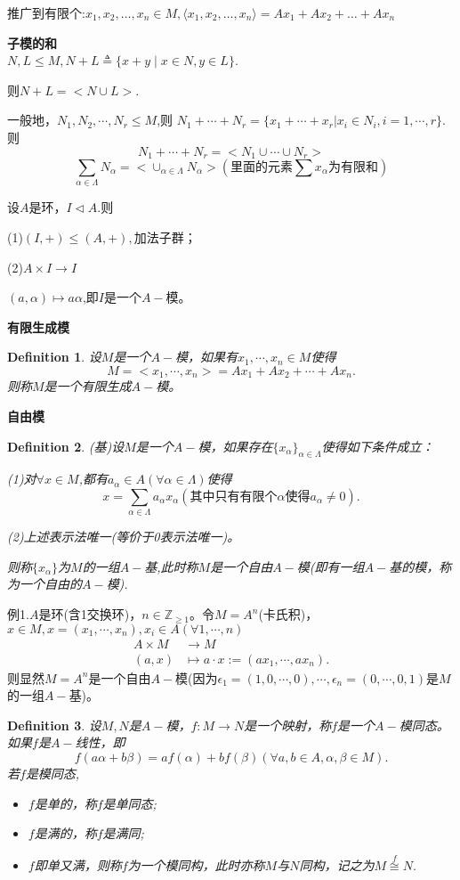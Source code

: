 \documentclass[UTF8]{article}
\newtheorem{defn}{Definition}[section]
\begin{document}
推广到有限个:$x_1,x_2,\dots,x_n\in M,\langle {x_1,x_2,\dots,x_n}\rangle=Ax_1+Ax_2+\dots+Ax_n$

\textbf{子模的和}\\
$N,L\leq M,N+L\triangleq\{x+y\mid x\in N,y\in L\}$.


则$N+L=<N\cup L>$.

一般地，$N_{1},N_{2},\cdots,N_{r}\leq M$,则
$N_{1}+\cdots+N_{r}=\{x_{1}+\cdots+x_{r}|x_{i}\in N_{i},i=1,\cdots,r\}.$则
$$
N_{1}+\cdots+N_{r}=<N_{1}\cup \cdots\cup N_{r}>
$$
$$
\sum_{\alpha\in \Lambda}N_{\alpha}=<\cup_{\alpha\in \Lambda}N_{\alpha}>(\text{里面的元素}\sum x_{\alpha}\text{为有限和})
$$

设$A$是环，$I\vartriangleleft A$.则

(1)$(I,+)\leq (A,+),$加法子群；

(2)$A\times I\rightarrow I$

$(a,\alpha)\mapsto a\alpha$,即$I$是一个$A-$模。

\textbf{有限生成模}

\begin{defn}
	设$M$是一个$A-$模，如果有$x_{1},\cdots,x_{n}\in M$使得
	$$
	M=<x_{1},\cdots,x_{n}>=Ax_{1}+Ax_{2}+\cdots+Ax_{n}.
	$$
	则称$M$是一个有限生成$A-$模。
\end{defn}

\textbf{自由模}

\begin{defn}
	(基)设$M$是一个$A-$模，如果存在$\{x_{\alpha}\}_{\alpha\in \Lambda}$使得如下条件成立：
	
	(1)对$\forall x\in M$,都有$a_{\alpha}\in A(\forall \alpha\in \Lambda)$使得
	$$
	x=\sum_{\alpha\in \Lambda}a_{\alpha}x_{\alpha}(\text{其中只有有限个}\alpha\text{使得}a_{\alpha}\neq 0).
	$$
	
	(2)上述表示法唯一(等价于0表示法唯一)。
	
	则称$\{x_{\alpha}\}$为$M$的一组$A-$基,此时称$M$是一个自由$A-$模(即有一组$A-$基的模，称为一个自由的$A-$模).
\end{defn}
例1.$A$是环(含1交换环)，$n\in \mathbb{Z}_{\geq 1}$。令$M=A^n$(卡氏积)，$x\in M,x=(x_{1},\cdots,x_{n}),x_{i}\in A(\forall 1,\cdots,n)$
\[
\begin{split}
A\times M&\rightarrow M\\
(a,x)&\mapsto a\cdot x:=(ax_{1},\cdots,ax_{n}).
\end{split}
\]
则显然$M=A^{n}$是一个自由$A-$模(因为$\epsilon_{1}=(1,0,\cdots,0),\cdots,\epsilon_{n}=(0,\cdots,0,1)$是$M$的一组$A-$基)。

\begin{defn}
	设$M,N$是$A-$模，$f:M\rightarrow N$是一个映射，称$f$是一个$A-$模同态。如果$f$是$A-$线性，即
	$$f(a\alpha+b\beta)=af(\alpha)+bf(\beta)(\forall a,b\in A,\alpha,\beta \in M).$$
	若$f$是模同态,
	\begin{itemize}
		\item $f$是单的，称$f$是单同态;
		\item $f$是满的，称$f$是满同;
		\item  $f$即单又满，则称$f$为一个模同构，此时亦称$M$与$N$同构，记之为$M\stackrel{f}{\cong }N.$
	\end{itemize}
\end{defn}
\end{document}
